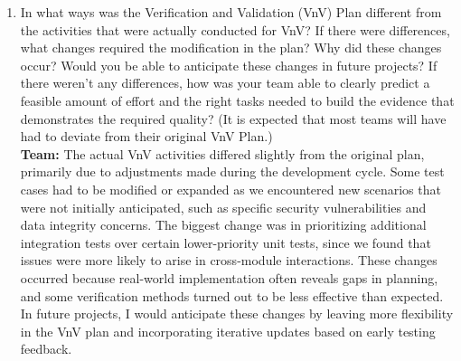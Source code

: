 \documentclass[12pt, titlepage]{article}
\begin{document}
\begin{enumerate}
  \item In what ways was the Verification and Validation (VnV) Plan different
  from the activities that were actually conducted for VnV?  If there were
  differences, what changes required the modification in the plan?  Why did
  these changes occur?  Would you be able to anticipate these changes in future
  projects?  If there weren't any differences, how was your team able to clearly
  predict a feasible amount of effort and the right tasks needed to build the
  evidence that demonstrates the required quality?  (It is expected that most
  teams will have had to deviate from their original VnV Plan.) \\

  \textbf{Team: } The actual VnV activities differed slightly from the original plan, primarily due to adjustments made during the development cycle. Some test cases had to be modified or expanded as we encountered new scenarios that were not initially anticipated, such as specific security vulnerabilities and data integrity concerns. The biggest change was in prioritizing additional integration tests over certain lower-priority unit tests, since we found that issues were more likely to arise in cross-module interactions. These changes occurred because real-world implementation often reveals gaps in planning, and some verification methods turned out to be less effective than expected. In future projects, I would anticipate these changes by leaving more flexibility in the VnV plan and incorporating iterative updates based on early testing feedback.


\end{enumerate}
\end{document}
